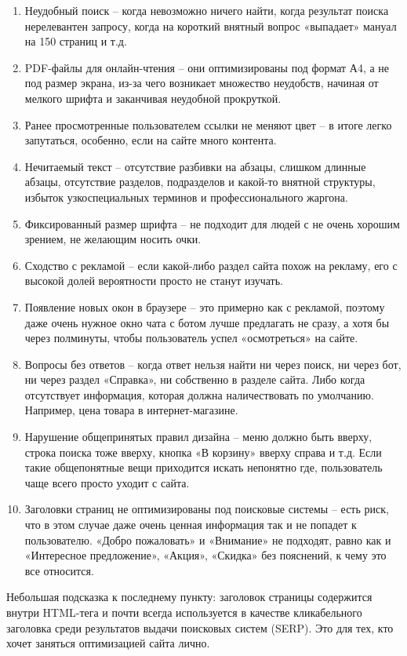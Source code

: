 \begin{enumerate}
    \item Неудобный поиск – когда невозможно ничего найти, когда результат поиска нерелевантен запросу, когда на короткий внятный вопрос «выпадает» мануал на 150 страниц и т.д.
    \item PDF-файлы для онлайн-чтения – они оптимизированы под формат А4, а не под размер экрана, из-за чего возникает множество неудобств, начиная от мелкого шрифта и заканчивая неудобной прокруткой.
    \item Ранее просмотренные пользователем ссылки не меняют цвет – в итоге легко запутаться, особенно, если на сайте много контента.
    \item Нечитаемый текст – отсутствие разбивки на абзацы, слишком длинные абзацы, отсутствие разделов, подразделов и какой-то внятной структуры, избыток узкоспециальных терминов и профессионального жаргона.
    \item Фиксированный размер шрифта – не подходит для людей с не очень хорошим зрением, не желающим носить очки.
    \item Сходство с рекламой – если какой-либо раздел сайта похож на рекламу, его с высокой долей вероятности просто не станут изучать.
    \item Появление новых окон в браузере – это примерно как с рекламой, поэтому даже очень нужное окно чата с ботом лучше предлагать не сразу, а хотя бы через полминуты, чтобы пользователь успел «осмотреться» на сайте.
    \item Вопросы без ответов – когда ответ нельзя найти ни через поиск, ни через бот, ни через раздел «Справка», ни собственно в разделе сайта. Либо когда отсутствует информация, которая должна наличествовать по умолчанию. Например, цена товара в интернет-магазине.
    \item Нарушение общепринятых правил дизайна – меню должно быть вверху, строка поиска тоже вверху, кнопка «В корзину» вверху справа и т.д. Если такие общепонятные вещи приходится искать непонятно где, пользователь чаще всего просто уходит с сайта.
    \item Заголовки страниц не оптимизированы под поисковые системы – есть риск, что в этом случае даже очень ценная информация так и не попадет к пользователю. «Добро пожаловать» и «Внимание» не подходят, равно как и «Интересное предложение», «Акция», «Скидка» без пояснений, к чему это все относится.
\end{enumerate}

Небольшая подсказка к последнему пункту: заголовок страницы содержится внутри HTML-тега и почти всегда используется в качестве кликабельного заголовка среди результатов выдачи поисковых систем (SERP). Это для тех, кто хочет заняться оптимизацией сайта лично.

